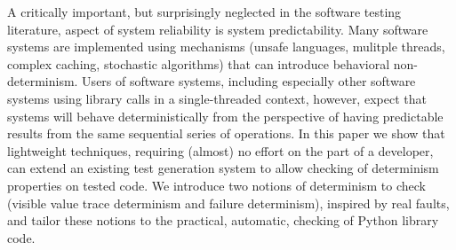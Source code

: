 A critically important, but surprisingly neglected in the software testing literature, aspect of system reliability is system predictability.  Many software systems are implemented using mechanisms (unsafe languages, mulitple threads, complex caching, stochastic algorithms) that can introduce behavioral non-determinism.  Users of software systems, including especially other software systems using library calls in a single-threaded context, however, expect that systems will behave deterministically from the perspective of having predictable results from the same sequential series of operations.  In this paper we show that lightweight techniques, requiring (almost) no effort on the part of a developer, can extend an existing test generation system to allow checking of determinism properties on tested code.  We introduce two notions of determinism to check (visible value trace determinism and failure determinism), inspired by real faults, and tailor these notions to the practical, automatic, checking of Python library code.